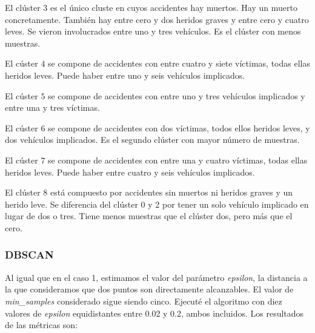 \documentclass[a4]{article}
\begin{document}
El clúster $3$ es el único cluste en cuyos accidentes hay muertos. Hay un muerto concretamente. También hay entre cero y dos heridos graves y entre cero y cuatro leves. Se vieron involucrados entre uno y tres vehículos. Es el clúster con menos muestras.

El cúster $4$ se compone de accidentes con entre cuatro y siete víctimas, todas ellas heridos leves. Puede haber entre uno y seis vehículos implicados.

El cúster $5$ se compone de accidentes con entre uno y tres vehículos implicados y entre una y tres víctimas.

El cúster $6$ se compone de accidentes con dos víctimas, todos ellos heridos leves, y dos vehículos implicados. Es el segundo clúster con mayor número de muestras.

El cúster $7$ se compone de accidentes con entre una y cuatro víctimas, todas ellas heridos leves. Puede haber entre cuatro y seis vehículos implicados.

El clúster $8$ está compuesto por accidentes sin muertos ni heridos graves y un herido leve. Se diferencia del clúster 0 y 2 por tener un solo vehículo implicado en lugar de dos o tres. Tiene menos muestras que el clúster dos, pero más que el cero.

\subsubsection{DBSCAN}

Al igual que en el caso 1, estimamos el valor del parámetro \textit{epsilon}, la distancia a la que consideramos que dos puntos son directamente alcanzables. El valor de \textit{min\_samples} considerado sigue siendo cinco. Ejecuté el algoritmo con diez valores de \textit{epsilon} equidistantes entre 0.02 y 0.2, ambos incluidos. Los resultados de las métricas son:
\end{document}

